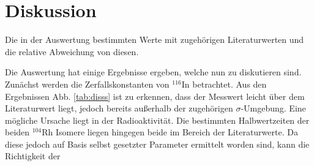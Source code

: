 
\section{Diskussion}
\label{sec:Diskussion}
\begin{table}
	\centering
	\caption{Die in der Auswertung bestimmten Werte mit zugehörigen Literaturwerten und die relative Abweichung von diesen.}
	
	\label{tab:disss}
\end{table}
Die Auswertung hat einige Ergebnisse ergeben, welche nun zu diskutieren sind. Zunächst werden die Zerfallskonstanten von $^{116}$In betrachtet. Aus den Ergebnissen Abb. \ref{tab:disss} ist zu erkennen, dass der Messwert leicht über dem Literaturwert liegt, jedoch bereits außerhalb der zugehörigen $\sigma$-Umgebung. Eine mögliche Ursache liegt in der Radioaktivität. Die bestimmten Halbwertzeiten der beiden $^{104}$Rh Isomere liegen hingegen beide im Bereich der Literaturwerte. Da
diese jedoch auf Basis selbst gesetzter Parameter ermittelt worden sind, kann die Richtigkeit der 
